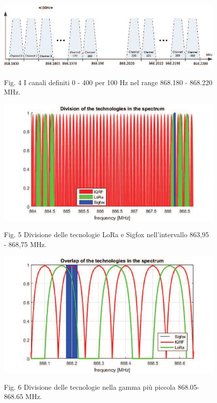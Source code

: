\documentclass[a4paper]{report} %
\begin{document}
\begin{figure}
\centering
\includegraphics[scale=.5]{Immagini/DivisioneBande.png}

Fig. 4 I canali definiti 0 - 400 per 100 Hz nel range 868.180 - 868.220 MHz. %
\end{figure}

\begin{figure}
\centering
\includegraphics[scale=.5]{Immagini/DivB.png}

Fig. 5 Divisione delle tecnologie LoRa e Sigfox nell'intervallo 863,95 - 868,75 MHz. %
\end{figure}

\begin{figure}
\centering
\includegraphics[scale=.5]{Immagini/DivisioneBande2.png}

Fig. 6 Divisione delle tecnologie nella gamma più piccola 868.05-868.65 MHz. %
\end{figure}
\end{document}

